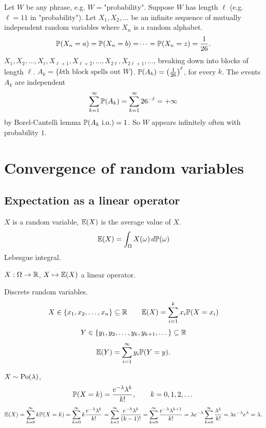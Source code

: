 \documentclass[10pt, a4paper]{article}
\begin{document}
\begin{example}
    Let $W$ be any phrase,
    e.g. $W = \text{"probability"}$.
    Suppose $W$ has length $\ell$
    (e.g. $\ell = 11$ in "probability").
    Let $X_1, X_2, \dotsc$ be an infinite sequence of mutually independent random variables where $X_n$ is a random alphabet.
    \[
    \P(X_n = a) = \P(X_n = b) = \dotsi = \P(X_n = z) = \frac{1}{26}.
    \]
    $X_1, X_2, \dotsc, X_{\ell}, X_{\ell + 1}, X_{\ell + 2}, \dotsc, X_{2\ell}, X_{2\ell + 1}, \dotsc$,
    breaking down into blocks of length $\ell$.
    $A_k = \{\text{$k$th block spells out $W$}\}$.
    $\P(A_k) = \left(\frac{1}{26}\right) ^ {\ell}$,
    for every $k$.
    The events $A_k$ are independent
    \[
    \sum_{k = 1}^{\infty}\P(A_k) = \sum_{k = 1}^{\infty}26 ^ {-\ell} = +\infty
    \]
    by Borel-Cantelli lemma $\P(A_k\text{ i.o.}) = 1$.
    So $W$ appears infinitely often with probability $1$.
\end{example}

\newpage

\section{Convergence of random variables}

\subsection{Expectation as a linear operator}

$X$ is a random variable,
$\E(X)$ is the average value of $X$.
\[
\E(X) = \int_{\Omega}X(\omega)\,d\P(\omega)
\]
Lebesgue integral.

$X : \Omega \to \R$,
$X \mapsto \E(X)$ a linear operator.

Discrete random variables.
\[
X \in \{x_1, x_2, \dotsc, x_n\} \subseteq \R\qquad \E(X) = \sum_{i = 1}^{k}x_i\P(X = x_i)
\]
\[
Y \in \{y_1, y_2, \dotsc, y_k, y_{k + 1}, \dotsc\} \subseteq \R
\]
\[
\E(Y) = \sum_{i = 1}^{\infty}y_i\P(Y = y).
\]

\begin{example}
    $X \sim \Po(\lambda)$,
    \[
    \P(X = k) = \frac{e ^ {-\lambda}\lambda ^ k}{k!},\qquad k = 0, 1, 2, \dotsc
    \]
    \[
    \E(X) = \sum_{k = 0}^{\infty}k\P(X = k) = \sum_{k = 0}^{\infty}k\frac{e ^ {-\lambda}\lambda ^ k}{k!} = \sum_{k = 1}^{\infty}\frac{e ^ {-\lambda}\lambda ^ k}{(k - 1)!} = \sum_{k = 0}^{\infty}\frac{e ^ {-\lambda}\lambda ^ {k + 1}}{k!} = \lambda e ^ {-\lambda}\sum_{k = 0}^{\infty}\frac{\lambda ^ k}{k!} = \lambda e ^ {-\lambda}e ^ {\lambda} = \lambda.
    \]
\end{example}
\end{document}

